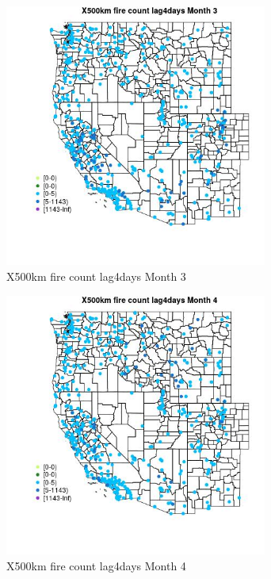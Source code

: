 \begin{figure} 
\centering  
\includegraphics[width=0.77\textwidth]{Code_Outputs/Report_ML_input_PM25_Step4_part_e_de_duplicated_aves_compiled_2019-05-14wNAs_MapObsMo3X500km_fire_count_lag4days.jpg} 
\caption{\label{fig:Report_ML_input_PM25_Step4_part_e_de_duplicated_aves_compiled_2019-05-14wNAsMapObsMo3X500km_fire_count_lag4days}X500km fire count lag4days Month 3} 
\end{figure} 
 

\begin{figure} 
\centering  
\includegraphics[width=0.77\textwidth]{Code_Outputs/Report_ML_input_PM25_Step4_part_e_de_duplicated_aves_compiled_2019-05-14wNAs_MapObsMo4X500km_fire_count_lag4days.jpg} 
\caption{\label{fig:Report_ML_input_PM25_Step4_part_e_de_duplicated_aves_compiled_2019-05-14wNAsMapObsMo4X500km_fire_count_lag4days}X500km fire count lag4days Month 4} 
\end{figure} 
 

